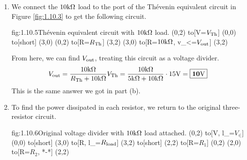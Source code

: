 \documentclass{article}
\begin{document}
\begin{enumerate}
        In this circuit, no current flows through $R_2$, flowing through the short instead. Thus we have $I_{SC} = \dfrac{V_\in }{R_1}$. From this, we can find $R_\Th$ from $R_\Th = \dfrac{V_\Th}{I_{SC}}$. This gives us 
        \[R_\Th = \frac{V_\Th}{I_{SC}} = \frac{V_\Th}{V_\in/R_1} = \frac{15\V}{30\V/10\k\Ohm} = \mans{5\k\Ohm}\]

        The Th\'evenin equivalent circuit takes the form shown below.
        \begin{circuit}{fig:1.10.4}{Th\'evenin equivalent circuit.}
            (0,2) to[V=$V_{\Th}$] (0,0)
            to[short, -o] (3,0)
            (0,2) to[R=$R_{\Th}$, -o] (3,2)
            (3,0) to[open, v_<=$V_\out$] (3,2)
        \end{circuit}
        In terms of behavior at the ports, this circuit is equivalent to the circuit in Figure \ref{fig:1.10.1}. 

        \item 
        We connect the $10\text{k}\Omega$ load to the port of the Th\'evenin equivalent circuit in Figure \ref{fig:1.10.3} to get the following circuit.
        \begin{circuit}{fig:1.10.5}{Th\'evenin equivalent circuit with $10\text{k}\Omega$ load.}
            (0,2) to[V=$V_{\Th}$] (0,0)
            to[short] (3,0)
            (0,2) to[R=$R_{\Th}$] (3,2)
            (3,0) to[R=$10\text{k}\Omega$, v_<=$V_\out$] (3,2)
        \end{circuit}
        From here, we can find $V_\out$, treating this circuit as a voltage divider.
        \[V_{\text{out}} = \frac{10\text{k}\Omega}{R_{\text{Th}} + 10\text{k}\Omega} V_{\text{Th}} = \frac{10\text{k}\Omega}{5\text{k}\Omega + 10\text{k}\Omega} \cdot 15\text{V} = \boxed{\mathbf{10\text{V}}}\] 
        This is the same answer we got in part (b).

        \item 
        To find the power dissipated in each resistor, we return to the original three-resistor circuit. 
        \begin{circuit}{fig:1.10.6}{Original voltage divider with $10\text{k}\Omega$ load attached.}
            (0,2) to[V, l_=$V_\in$] (0,0)
                to[short] (3,0)
                to[R, l_=$R_{\text{load}}$] (3,2)
                to[short] (2,2)
                to[R=$R_1$] (0,2)
            (2,0) to[R=$R_2$, *-*] (2,2)
        \end{circuit}


\end{enumerate}
\end{document}
